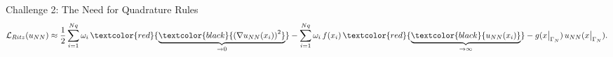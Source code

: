\begin{frame}{Challenge 2: The Need for Quadrature Rules}
\vspace{-0.3cm}
$$
\notag
\mathcal{L}_{Ritz} (u_{NN}) \approx \frac{1}{2} \sum_{i=1}^{Nq} \omega_i\, \textcolor{red}{\underbrace{\textcolor{black}{\left( \nabla u_{NN}(x_{i}) \right)^2}}_{\rightarrow 0}}
 - \sum_{i=1}^{Nq} \omega_i\, f(x_{i}) \,  \textcolor{red} {\underbrace{\textcolor{black}{{u_{NN}(x_{i})}}}_{\rightarrow \infty}} -g(x\big|_{\Gamma_N}) \, u_{NN}(x\big|_{\Gamma_N}).
$$

\end{frame}